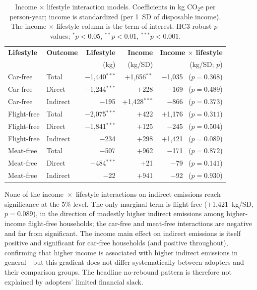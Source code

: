 \documentclass[12pt]{article}
\begin{document}
\begin{table}[!htbp]
\centering
\small
\caption{Income $\times$ lifestyle interaction models. Coefficients in kg CO$_2$e per person-year; income is standardized (per 1~SD of disposable income). The income $\times$ lifestyle column is the term of interest. HC3-robust $p$-values; $^{*}p<0.05$, $^{**}p<0.01$, $^{***}p<0.001$.}
\label{tab:income_lifestyle}
\begin{tabular}{llrrr}
\toprule
\textbf{Lifestyle} & \textbf{Outcome} & \textbf{Lifestyle} & \textbf{Income} & \textbf{Income $\times$ lifestyle} \\
 & & (kg) & (kg/SD) & (kg/SD; $p$) \\
\midrule
Car-free    & Total    & $-$1{,}440$^{***}$ & $+$1{,}656$^{**}$  & $-$1{,}035 \ ($p=0.368$) \\
Car-free    & Direct   & $-$1{,}244$^{***}$ & $+$228            & $-$169 \ ($p=0.489$) \\
Car-free    & Indirect & $-$195             & $+$1{,}428$^{***}$ & $-$866 \ ($p=0.373$) \\
Flight-free & Total    & $-$2{,}075$^{***}$ & $+$422            & $+$1{,}176 \ ($p=0.311$) \\
Flight-free & Direct   & $-$1{,}841$^{***}$ & $+$125            & $-$245 \ ($p=0.504$) \\
Flight-free & Indirect & $-$234             & $+$298            & $+$1{,}421 \ ($p=0.089$) \\
Meat-free   & Total    & $-$507             & $+$962            & $-$171 \ ($p=0.872$) \\
Meat-free   & Direct   & $-$484$^{***}$     & $+$21             & $-$79 \ ($p=0.141$) \\
Meat-free   & Indirect & $-$22              & $+$941            & $-$92 \ ($p=0.930$) \\
\bottomrule
\end{tabular}
\end{table}

None of the income~$\times$~lifestyle interactions on indirect emissions reach significance at the 5\% level. The only marginal term is flight-free ($+$1{,}421~kg/SD, $p=0.089$), in the direction of modestly higher indirect emissions among higher-income flight-free households; the car-free and meat-free interactions are negative and far from significant. The income main effect on indirect emissions is itself positive and significant for car-free households (and positive throughout), confirming that higher income is associated with higher indirect emissions in general---but this gradient does not differ systematically between adopters and their comparison groups. The headline no-rebound pattern is therefore not explained by adopters' limited financial slack.
\end{document}
